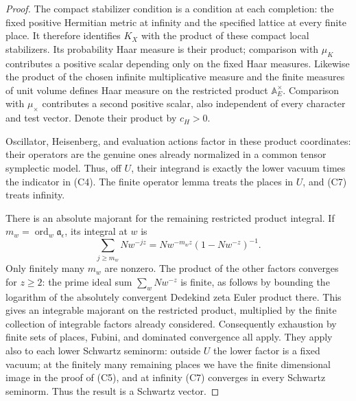 \begin{proof}
The compact stabilizer condition is a condition at each completion:
the fixed positive Hermitian metric at infinity and the specified
lattice at every finite place. It therefore identifies \(K_X\)
with the product of these compact local stabilizers. Its probability
Haar measure is their product; comparison with \(\mu_K\) contributes a
positive scalar depending only on the fixed Haar measures.
Likewise the product of the chosen infinite multiplicative measure and
the finite measures of unit volume defines Haar measure on the
restricted product \(\mathbb A_E^\times\). Comparison with
\(\mu_\times\) contributes a second positive scalar, also independent
of every character and test vector. Denote their product by \(c_H>0\).

Oscillator, Heisenberg, and evaluation actions factor in these product
coordinates: their operators are the genuine ones already normalized
in a common tensor symplectic model. Thus, off \(U\), their integrand is
exactly the lower vacuum times the indicator in (C4). The finite
operator lemma treats the places in \(U\), and (C7) treats infinity.

There is an absolute majorant for the remaining restricted product
integral. If \(m_w=\operatorname{ord}_w\mathfrak a_\epsilon\), its
integral at \(w\) is
\[
  \sum_{j\ge m_w}Nw^{-jz}
          =Nw^{-m_wz}(1-Nw^{-z})^{-1}.
\]
Only finitely many \(m_w\) are nonzero. The product of the other factors
converges for \(z\ge2\): the prime ideal sum
\(\sum_wNw^{-z}\) is finite, as follows by bounding the logarithm of
the absolutely convergent Dedekind zeta Euler product there.
This gives an integrable majorant on the restricted product, multiplied
by the finite collection of integrable factors already considered.
Consequently exhaustion by finite sets of places, Fubini, and dominated
convergence all apply. They apply also to each lower Schwartz seminorm:
outside \(U\) the lower factor is a fixed vacuum; at the finitely many
remaining places we have the finite dimensional image in the proof of
(C5), and at infinity (C7) converges in every Schwartz seminorm.
Thus the result is a Schwartz vector.


\end{proof}
